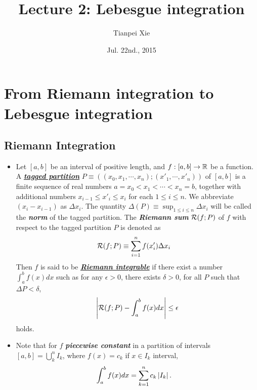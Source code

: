 \documentclass[11pt]{article}
\begin{document}
\title{Lecture 2: Lebesgue integration}
\author{ Tianpei Xie}
\date{ Jul. 22nd., 2015 }
\maketitle
\tableofcontents
\newpage
\section{From Riemann integration to Lebesgue integration}
\subsection{Riemann Integration}
\begin{itemize}
\item \begin{definition}
Let $[a, b]$ be an interval of positive length, and $f : [a, b] \rightarrow {\mathbb R}$ be a function. A \underline{\emph{\textbf{tagged partition}}}
$P \equiv ((x_{0}, x_{1}, \cdots, x_{n}); (x'_{1}, \cdots, x'_{n}))$ of $[a, b]$ is a finite sequence of real numbers $a = x_0 < x_1 < \cdots < x_{n} = b$, together with additional numbers $x_{i-1} \le  x'_{i} \le  x_{i}$ for each $1\le i\le n$. We abbreviate $(x_{i}- x_{i-1})$ as $\Delta x_{i}$. The quantity $\Delta(P) \equiv \sup_{1\le i\le n} \Delta x_{i}$ will be called the \emph{\textbf{norm}} of the tagged partition. The \emph{\textbf{Riemann sum}} ${\mathcal R}(f ; P)$ of $f$ with respect to the tagged partition $P$ is denoted as
\begin{align*}
{\mathcal R}(f ; P) &\equiv \sum_{i=1}^{n}f(x'_{i})\Delta x_{i}
\end{align*} Then $f$ is said to be \underline{\emph{\textbf{Riemann integrable}}} if there exist a number $\int_{a}^{b}f(x)dx$ such as for any $\epsilon>0$, there exists $\delta>0$, for all $P$ such that $\Delta P < \delta$,  
\begin{align*}
\left\lvert {\mathcal R}(f ; P) - \int_{a}^{b}f(x)dx \right\rvert \le \epsilon
\end{align*}
holds.
\end{definition}

\item \begin{remark}
Note that for $f$ \emph{\textbf{piecewise constant}} in a partition of intervals $[a,b]= \bigcup_{k}^{n} I_{k}$, where $f(x)=c_{k}$ if $x\in I_{k}$ interval, 
\begin{align*}
\int_{a}^{b}f(x)dx &= \sum_{k=1}^{n}c_{k}\left\lvert I_{k} \right\rvert.
\end{align*}
\end{remark}


\end{itemize}
\end{document}
